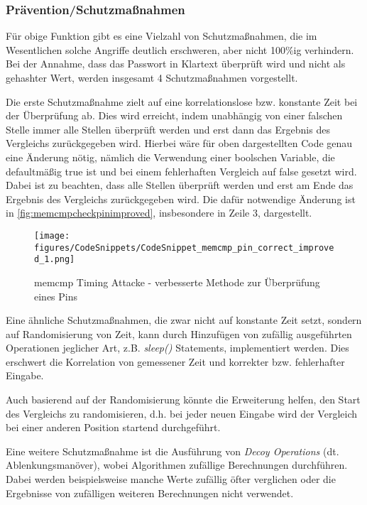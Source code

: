 \documentclass[a4paper,
DIV=13,
12pt,
BCOR=10mm,
department=FakIM,
oneside,
parskip=half,
automark,
listof=totocnumbered,
bibliography=totocnumbered,
acronym=totocnumbered
] {OTHRartcl}
\begin{document}
\subsubsection{Prävention/Schutzmaßnahmen}
Für obige Funktion gibt es eine Vielzahl von Schutzmaßnahmen, die im Wesentlichen solche Angriffe deutlich erschweren, aber nicht 100\%ig verhindern.
Bei der Annahme, dass das Passwort in Klartext überprüft wird und nicht als gehashter Wert, werden insgesamt 4 Schutzmaßnahmen vorgestellt.

Die erste Schutzmaßnahme zielt auf eine korrelationslose bzw. konstante Zeit bei der Überprüfung ab. Dies wird erreicht, indem unabhängig
von einer falschen Stelle immer alle Stellen überprüft werden und erst dann das Ergebnis des Vergleichs zurückgegeben wird.
Hierbei wäre für oben dargestellten Code genau eine Änderung nötig, nämlich die Verwendung einer boolschen Variable,
die defaultmäßig true ist und bei einem fehlerhaften Vergleich auf false gesetzt wird. Dabei ist zu beachten, dass
alle Stellen überprüft werden und erst am Ende das Ergebnis des Vergleichs zurückgegeben wird. Die dafür notwendige Änderung ist in \autoref{fig:memcmpcheckpinimproved}, insbesondere in Zeile 3, dargestellt.
\begin{figure}[ht!]
  \begin{center}
    \texttt{[image: figures/CodeSnippets/CodeSnippet\_memcmp\_pin\_correct\_improved\_1.png]}
    \caption{memcmp Timing Attacke - verbesserte Methode zur Überprüfung eines Pins}
    \label{fig:memcmpcheckpinimproved}
  \end{center}
\end{figure}
Eine ähnliche Schutzmaßnahmen, die zwar nicht auf konstante Zeit setzt, sondern auf Randomisierung von Zeit, kann durch Hinzufügen von
zufällig ausgeführten Operationen jeglicher Art, z.B. \textit{sleep()} Statements, implementiert werden. Dies erschwert die Korrelation von gemessener Zeit und korrekter bzw. fehlerhafter Eingabe.

Auch basierend auf der Randomisierung könnte die Erweiterung helfen, den Start des Vergleichs zu randomisieren, d.h. bei jeder neuen Eingabe wird der Vergleich bei
einer anderen Position startend durchgeführt.

Eine weitere Schutzmaßnahme ist die Ausführung von \textit{Decoy Operations} (dt. Ablenkungsmanöver), wobei Algorithmen zufällige Berechnungen durchführen.
Dabei werden beispielsweise manche Werte zufällig öfter verglichen oder die Ergebnisse von zufälligen weiteren Berechnungen nicht verwendet. \cite{Hardware Hacking Handbook Chapter 14}
\end{document}
